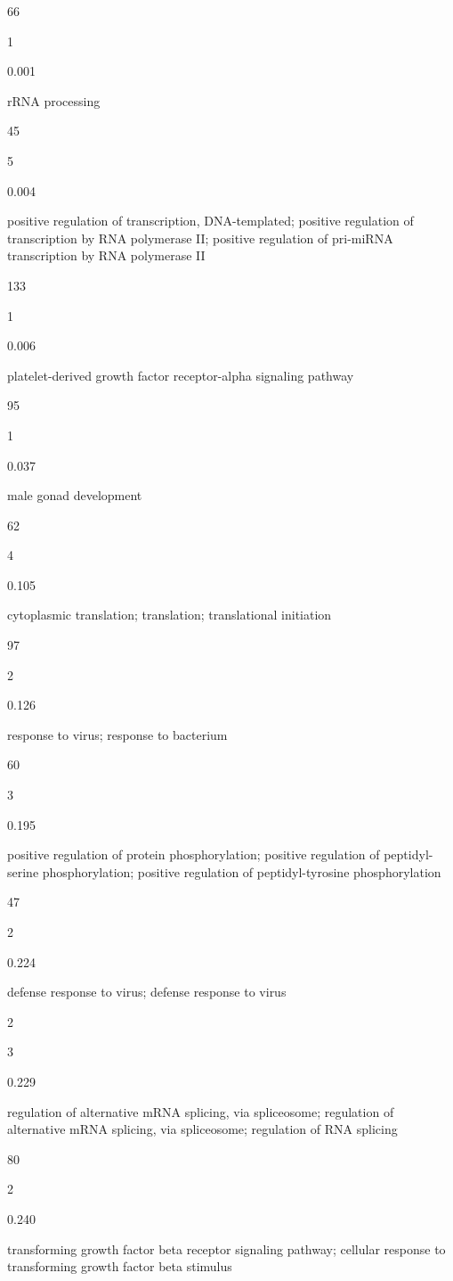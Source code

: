 \documentclass[
  letterpaper,
  DIV=11,
  numbers=noendperiod,
  openany,
  oneside]{scrreprt}
\begin{document}
66

1

0.001

rRNA processing

45

5

0.004

positive regulation of transcription, DNA-templated; positive regulation
of transcription by RNA polymerase II; positive regulation of pri-miRNA
transcription by RNA polymerase II

133

1

0.006

platelet-derived growth factor receptor-alpha signaling pathway

95

1

0.037

male gonad development

62

4

0.105

cytoplasmic translation; translation; translational initiation

97

2

0.126

response to virus; response to bacterium

60

3

0.195

positive regulation of protein phosphorylation; positive regulation of
peptidyl-serine phosphorylation; positive regulation of
peptidyl-tyrosine phosphorylation

47

2

0.224

defense response to virus; defense response to virus

2

3

0.229

regulation of alternative mRNA splicing, via spliceosome; regulation of
alternative mRNA splicing, via spliceosome; regulation of RNA splicing

80

2

0.240

transforming growth factor beta receptor signaling pathway; cellular
response to transforming growth factor beta stimulus
\end{document}
